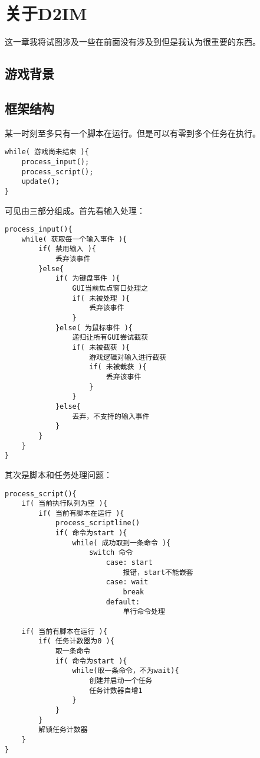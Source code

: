 \chapter{关于D2IM}
这一章我将试图涉及一些在前面没有涉及到但是我认为很重要的东西。
\newpage
\section{游戏背景}

%
%
%

\section{框架结构}
某一时刻至多只有一个脚本在运行。但是可以有零到多个任务在执行。
\begin{lstlisting}
while( 游戏尚未结束 ){
    process_input();
    process_script();
    update();
}
\end{lstlisting}
可见由三部分组成。首先看输入处理：
\begin{lstlisting}
process_input(){
    while( 获取每一个输入事件 ){
        if( 禁用输入 ){
            丢弃该事件
        }else{
            if( 为键盘事件 ){
                GUI当前焦点窗口处理之
                if( 未被处理 ){
                    丢弃该事件
                }
            }else( 为鼠标事件 ){
                递归让所有GUI尝试截获
                if( 未被截获 ){
                    游戏逻辑对输入进行截获
                    if( 未被截获 ){
                        丢弃该事件
                    }
                }
            }else{
                丢弃，不支持的输入事件
            }
        }
    }
}
\end{lstlisting}
其次是脚本和任务处理问题：
\begin{lstlisting}
process_script(){
    if( 当前执行队列为空 ){
        if( 当前有脚本在运行 ){
            process_scriptline()
            if( 命令为start ){
                while( 成功取到一条命令 ){
                    switch 命令
                        case: start
                            报错，start不能嵌套
                        case: wait
                            break
                        default:
                            单行命令处理

    if( 当前有脚本在运行 ){
        if( 任务计数器为0 ){
            取一条命令
            if( 命令为start ){
                while(取一条命令，不为wait){
                    创建并启动一个任务
                    任务计数器自增1
                }
            }
        }
        解锁任务计数器
    }
}
\end{lstlisting}

